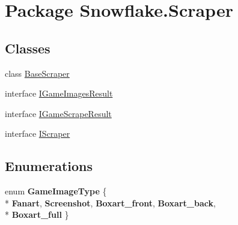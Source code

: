 \hypertarget{namespace_snowflake_1_1_scraper}{}\section{Package Snowflake.\+Scraper}
\label{namespace_snowflake_1_1_scraper}
\subsection*{Classes}
\begin{DoxyCompactItemize}
\item 
class \hyperlink{class_snowflake_1_1_scraper_1_1_base_scraper}{Base\+Scraper}
\item 
interface \hyperlink{interface_snowflake_1_1_scraper_1_1_i_game_images_result}{I\+Game\+Images\+Result}
\item 
interface \hyperlink{interface_snowflake_1_1_scraper_1_1_i_game_scrape_result}{I\+Game\+Scrape\+Result}
\item 
interface \hyperlink{interface_snowflake_1_1_scraper_1_1_i_scraper}{I\+Scraper}
\end{DoxyCompactItemize}
\subsection*{Enumerations}
\begin{DoxyCompactItemize}
\item 
\hypertarget{namespace_snowflake_1_1_scraper_a1c90593a6ae1da689ebce8efcf838d7d}{}enum {\bfseries Game\+Image\+Type} \{ \\*
{\bfseries Fanart}, 
{\bfseries Screenshot}, 
{\bfseries Boxart\+\_\+front}, 
{\bfseries Boxart\+\_\+back}, 
\\*
{\bfseries Boxart\+\_\+full}
 \}\label{namespace_snowflake_1_1_scraper_a1c90593a6ae1da689ebce8efcf838d7d}

\end{DoxyCompactItemize}

